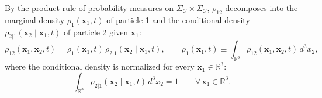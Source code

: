 \documentclass[11pt, a4paper]{article}
\theoremstyle{definition}
\begin{document}
By the product rule of probability measures on $\Sigma_{\mathcal{O}} \times \Sigma_{\mathcal{O}}$, $\rho_{12}$ decomposes into the marginal density $\rho_1(\mathbf{x}_1, t)$ of particle 1 and the conditional density $\rho_{2|1}(\mathbf{x}_2 \mid \mathbf{x}_1, t)$ of particle 2 given $\mathbf{x}_1$:
\begin{equation}
\label{eq:conditional_bayes}
\rho_{12}(\mathbf{x}_1, \mathbf{x}_2, t) = \rho_1(\mathbf{x}_1, t)\,\rho_{2|1}(\mathbf{x}_2 \mid \mathbf{x}_1, t), \qquad \rho_1(\mathbf{x}_1, t) \equiv \int_{\mathbb{R}^3} \rho_{12}(\mathbf{x}_1, \mathbf{x}_2, t)\,d^3x_2,
\end{equation}
where the conditional density is normalized for every $\mathbf{x}_1 \in \mathbb{R}^3$:
\begin{equation}
\label{eq:cond_norm}
\int_{\mathbb{R}^3} \rho_{2|1}(\mathbf{x}_2 \mid \mathbf{x}_1, t)\,d^3x_2 = 1 \qquad \forall\,\mathbf{x}_1 \in \mathbb{R}^3.
\end{equation}
\end{document}

